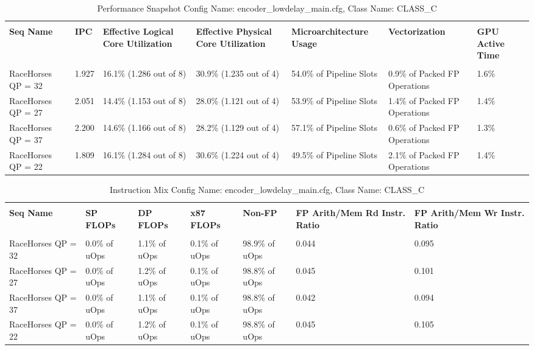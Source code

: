 \documentclass{article}%
\begin{document}
\begin{longtabu}{| X[l] | X[l] | X[l] | X[l] | X[l] | X[l] | X[l] |}%
\caption{%
Performance Snapshot\newline%
 Config Name: encoder\_lowdelay\_main.cfg,\newline%
 Class Name: CLASS\_C\newline%
%
}%
\hline%
&&&&&&\\%
\textbf{Seq Name}&\textbf{IPC}&\textbf{Effective Logical Core Utilization}&\textbf{Effective Physical Core Utilization}&\textbf{Microarchitecture Usage}&\textbf{Vectorization}&\textbf{GPU Active Time}\\%
&&&&&&\\%
\hline%
\endhead%
RaceHorses\newline%
 QP = 32&1.927&16.1\% (1.286 out of 8)&30.9\% (1.235 out of 4)&54.0\% of Pipeline Slots&0.9\% of Packed FP Operations&1.6\%\\%
\hline%
RaceHorses\newline%
 QP = 27&2.051&14.4\% (1.153 out of 8)&28.0\% (1.121 out of 4)&53.9\% of Pipeline Slots&1.4\% of Packed FP Operations&1.4\%\\%
\hline%
RaceHorses\newline%
 QP = 37&2.200&14.6\% (1.166 out of 8)&28.2\% (1.129 out of 4)&57.1\% of Pipeline Slots&0.6\% of Packed FP Operations&1.3\%\\%
\hline%
RaceHorses\newline%
 QP = 22&1.809&16.1\% (1.284 out of 8)&30.6\% (1.224 out of 4)&49.5\% of Pipeline Slots&2.1\% of Packed FP Operations&1.4\%\\%
\hline%
\end{longtabu}%
\begin{longtabu}{| X[l] | X[l] | X[l] | X[l] | X[l] | X[l] | X[l] |}%
\caption{%
Instruction Mix\newline%
 Config Name: encoder\_lowdelay\_main.cfg,\newline%
 Class Name: CLASS\_C\newline%
%
}%
\hline%
&&&&&&\\%
\textbf{Seq Name}&\textbf{SP FLOPs}&\textbf{DP FLOPs}&\textbf{x87 FLOPs}&\textbf{Non{-}FP}&\textbf{FP Arith/Mem Rd Instr. Ratio}&\textbf{FP Arith/Mem Wr Instr. Ratio}\\%
&&&&&&\\%
\hline%
\endhead%
RaceHorses\newline%
 QP = 32&0.0\% of uOps&1.1\% of uOps&0.1\% of uOps&98.9\% of uOps&0.044&0.095\\%
\hline%
RaceHorses\newline%
 QP = 27&0.0\% of uOps&1.2\% of uOps&0.1\% of uOps&98.8\% of uOps&0.045&0.101\\%
\hline%
RaceHorses\newline%
 QP = 37&0.0\% of uOps&1.1\% of uOps&0.1\% of uOps&98.8\% of uOps&0.042&0.094\\%
\hline%
RaceHorses\newline%
 QP = 22&0.0\% of uOps&1.2\% of uOps&0.1\% of uOps&98.8\% of uOps&0.045&0.105\\%
\hline%
\end{longtabu}%
\end{document}
